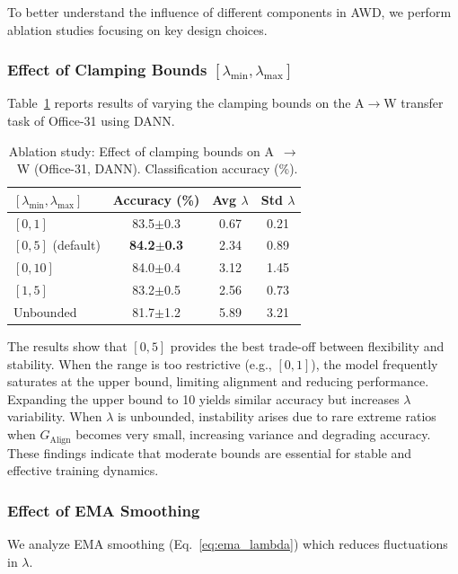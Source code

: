 \documentclass[pdflatex,sn-mathphys-num]{sn-jnl}
\theoremstyle{thmstyleone}
\theoremstyle{thmstyletwo}
\theoremstyle{thmstylethree}
\begin{document}
To better understand the influence of different components in AWD, we perform ablation studies focusing on key design choices.

\subsubsection{Effect of Clamping Bounds \texorpdfstring{$[\lambda_{\min}, \lambda_{\max}]$}{[lambda\_min, lambda\_max]}}

Table~\ref{tab:ablation_clamp} reports results of varying the clamping bounds on the A$\to$W transfer task of Office-31 using DANN.

\begin{table}[h]
\centering
\caption{Ablation study: Effect of clamping bounds on A~$\to$~W (Office-31, DANN). Classification accuracy (\%).}
\label{tab:ablation_clamp}
\begin{tabular}{lccc}
\hline
\textbf{$[\lambda_{\min}, \lambda_{\max}]$} & \textbf{Accuracy (\%)} & \textbf{Avg $\lambda$} & \textbf{Std $\lambda$} \\
\hline
$[0, 1]$ & 83.5$\pm$0.3 & 0.67 & 0.21 \\
$[0, 5]$ (default) & \textbf{84.2$\pm$0.3} & 2.34 & 0.89 \\
$[0, 10]$ & 84.0$\pm$0.4 & 3.12 & 1.45 \\
$[1, 5]$ & 83.2$\pm$0.5 & 2.56 & 0.73 \\
Unbounded & 81.7$\pm$1.2 & 5.89 & 3.21 \\
\hline
\end{tabular}
\end{table}

The results show that $[0,5]$ provides the best trade-off between flexibility and stability.
When the range is too restrictive (e.g., $[0,1]$), the model frequently saturates at the upper bound, limiting alignment and reducing performance.
Expanding the upper bound to 10 yields similar accuracy but increases $\lambda$ variability.
When $\lambda$ is unbounded, instability arises due to rare extreme ratios when $G_{\text{Align}}$ becomes very small, increasing variance and degrading accuracy.
These findings indicate that moderate bounds are essential for stable and effective training dynamics.

\subsubsection{Effect of EMA Smoothing}

We analyze EMA smoothing (Eq.~\ref{eq:ema_lambda}) which reduces fluctuations in $\lambda$.
\end{document}
